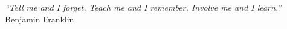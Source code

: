 \cleardoublepage
\thispagestyle{plain}

\vspace*{8cm}

\begin{flushright}
    \textsl{``Tell me and I forget. Teach me and I remember. Involve me and I learn.''}\\
	\vspace*{1.5cm}
    Benjamin Franklin
\end{flushright}
